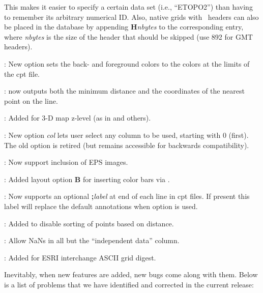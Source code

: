 \begin{description}
This makes it easier to specify a certain data set (i.e., ``ETOPO2'') than having to remember its arbitrary numerical
ID.  Also, native grids with \GMT\ headers can also be placed in the database by appending \textbf{H}\emph{nbytes} to the
corresponding  entry, where \emph{nbytes} is the size of the header that should be skipped
(use 892 for GMT headers).
\item [\GMTprog{makecpt}]: New option  sets the back- and foreground colors to the colors at the limits of the cpt file.
\item [\GMTprog{mapproject}]:  now outputs both the minimum distance and the coordinates
of the nearest point on the line.
\item [\GMTprog{pscoast}]: Added  for 3-D map z-level (as in  and others).
\item [\GMTprog{pshistogram}]: New option \emph{col} lets user select any column to be used, starting
with 0 (first).  The old  option is retired (but remains accessible for backwards compatibility).  
\item [\GMTprog{psimage}]: Now support inclusion of EPS images.
\item [\GMTprog{pslegend}]: Added layout option \textbf{B} for inserting color bars via .
\item [\GMTprog{psscale}]: Now supports an optional \textbf{;}\emph{label} at end of each line in cpt files.
If present this label will replace the default annotations when option  is used.
\item [\GMTprog{psxyz}]: Added  to disable sorting of points based on distance.
\item [\GMTprog{sample1d}]: Allow NaNs in all but the ``independent data'' column.
\item [\GMTprog{xyz2grd}]: Added  for ESRI interchange ASCII grid digest.
\end{description}

Inevitably, when new features are added, new bugs come along with them.  Below is a list of problems
that we have identified and corrected in the current release:

